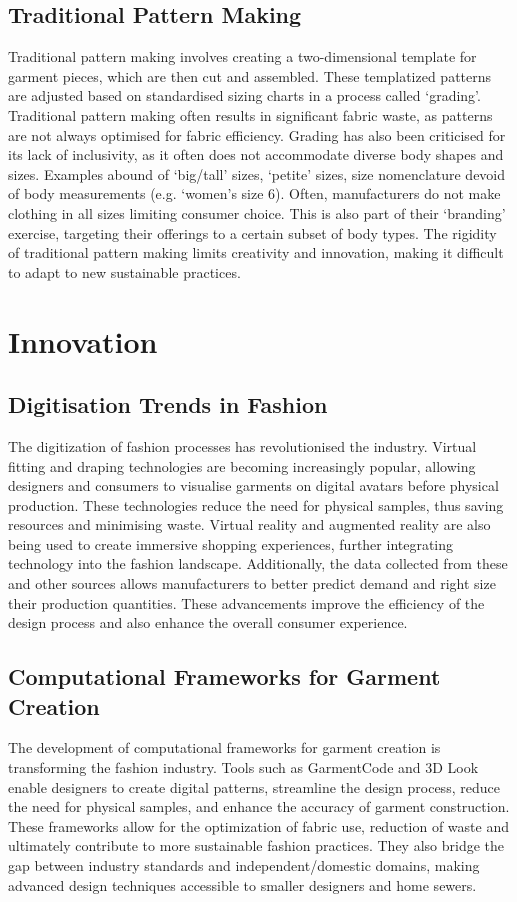 \subsection{Traditional Pattern Making}
Traditional pattern making involves creating a two-dimensional template for garment pieces, which are then cut and assembled. These templatized patterns are adjusted based on standardised sizing charts in a process called ‘grading’. Traditional pattern making often results in significant fabric waste, as patterns are not always optimised for fabric efficiency. 
Grading has also been criticised for its lack of inclusivity, as it often does not accommodate diverse body shapes and sizes. Examples abound of ‘big/tall’ sizes, ‘petite’ sizes, size nomenclature devoid of body measurements (e.g. ‘women’s size 6). Often, manufacturers do not make clothing in all sizes limiting consumer choice. This is also part of their ‘branding’ exercise, targeting their offerings to a certain subset of body types. The rigidity of traditional pattern making limits creativity and innovation, making it difficult to adapt to new sustainable practices.


\section{Innovation} \label{sec:sections}

\subsection{Digitisation Trends in Fashion}
The digitization of fashion processes has revolutionised the industry. Virtual fitting and draping technologies are becoming increasingly popular, allowing designers and consumers to visualise garments on digital avatars before physical production. These technologies reduce the need for physical samples, thus saving resources and minimising waste. Virtual reality and augmented reality are also being used to create immersive shopping experiences, further integrating technology into the fashion landscape. Additionally, the data collected from these and other sources allows manufacturers to better predict demand and right size their production quantities. These advancements improve the efficiency of the design process and also enhance the overall consumer experience.

\subsection{Computational Frameworks for Garment Creation}
The development of computational frameworks for garment creation is transforming the fashion industry. Tools such as GarmentCode and 3D Look enable designers to create digital patterns, streamline the design process, reduce the need for physical samples, and enhance the accuracy of garment construction.
These frameworks allow for the optimization of fabric use,  reduction of waste and ultimately contribute to more sustainable fashion practices. They also bridge the gap between industry standards and independent/domestic domains, making advanced design techniques accessible to smaller designers and home sewers.


